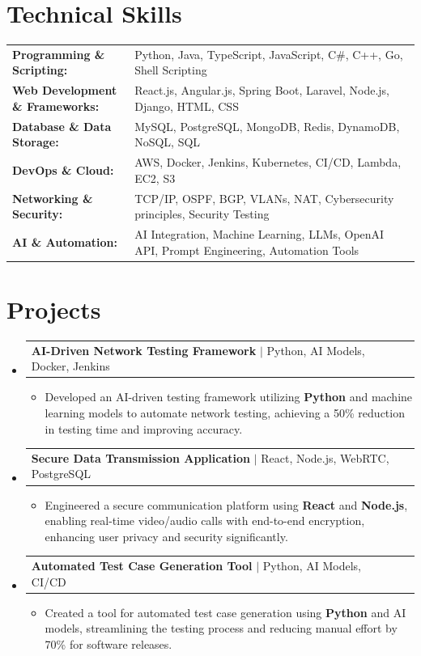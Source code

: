 \documentclass[letterpaper,10pt]{article}
\makeatletter
\newcommand{\resumeItem}[1]{
  \item{\fontsize{8pt}{9pt}\selectfont
    #1 \vspace{-3pt}
  }
}
\newcommand{\resumeProjectHeading}[2]{
    \item
    \begin{tabular*}{1.001\textwidth}{l@{\extracolsep{\fill}}r}
      \fontsize{8.5pt}{10pt}#1 & \textbf{\fontsize{8.5pt}{10pt} #2}\\
    \end{tabular*}\vspace{-7pt}
}
\newcommand{\resumeSubHeadingListStart}{\begin{itemize}[leftmargin=0pt, label={}]}
\newcommand{\resumeSubHeadingListEnd}{\end{itemize}}
\newcommand{\resumeItemListStart}{\begin{itemize}[leftmargin=*]}
\newcommand{\resumeItemListEnd}{\end{itemize}\vspace{-5pt}}
\makeatother
\begin{document}
\section{Technical Skills}
        \vspace{-14pt}
        \begin{table}[h]
            \fontsize{8pt}{9pt}\selectfont
            \begin{tabular}{p{0.3\linewidth} p{0.7\linewidth}}
                \textbf{Programming \& Scripting:} & Python, Java, TypeScript, JavaScript, C\#, C++, Go, Shell Scripting \\
                \textbf{Web Development \& Frameworks:} & React.js, Angular.js, Spring Boot, Laravel, Node.js, Django, HTML, CSS \\
                \textbf{Database \& Data Storage:} & MySQL, PostgreSQL, MongoDB, Redis, DynamoDB, NoSQL, SQL \\
                \textbf{DevOps \& Cloud:} & AWS, Docker, Jenkins, Kubernetes, CI/CD, Lambda, EC2, S3 \\
                \textbf{Networking \& Security:} & TCP/IP, OSPF, BGP, VLANs, NAT, Cybersecurity principles, Security Testing \\
                \textbf{AI \& Automation:} & AI Integration, Machine Learning, LLMs, OpenAI API, Prompt Engineering, Automation Tools \\
            \end{tabular}
        \end{table}
 \vspace{-18pt}

\section{Projects}
    \vspace{-5pt}
    \resumeSubHeadingListStart
          \resumeProjectHeading
            {\textbf{AI-Driven Network Testing Framework} $|$ Python, AI Models, Docker, Jenkins}{}
            \resumeItemListStart
                \resumeItem{Developed an AI-driven testing framework utilizing \textbf{Python} and machine learning models to automate network testing, achieving a 50\% reduction in testing time and improving accuracy.}
            \resumeItemListEnd
        \vspace{-12pt}
    
        \resumeProjectHeading
            {\textbf{Secure Data Transmission Application} $|$ React, Node.js, WebRTC, PostgreSQL}{}
        \resumeItemListStart
                \resumeItem{Engineered a secure communication platform using \textbf{React} and \textbf{Node.js}, enabling real-time video/audio calls with end-to-end encryption, enhancing user privacy and security significantly.}
        \resumeItemListEnd
      \vspace{-12pt}
      \resumeProjectHeading
        {\textbf{Automated Test Case Generation Tool} $|$ Python, AI Models, CI/CD}{}
    \resumeItemListStart
            \resumeItem{Created a tool for automated test case generation using \textbf{Python} and AI models, streamlining the testing process and reducing manual effort by 70\% for software releases.}
    \resumeItemListEnd
    \resumeSubHeadingListEnd
\end{document}
